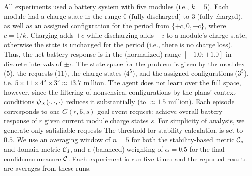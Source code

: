 All experiments used a battery system with five modules (i.e., $k=5$). 
%
Each module had a charge state in the range $0$ (fully discharged) to $3$ (fully charged), as well as an assigned configuration for the period from $\{+c, 0, -c\}$, where $c=1/k$.
%
%
Charging adds $+c$ while discharging adds $-c$ to a module's charge state, otherwise the state is unchanged for the period (i.e., there is no charge loss). Thus, the net battery response is in the (normalized) range $[-1.0:+1.0]$ in discrete intervals of $\pm c$. The state space for the problem is given by the modules ($5$), the requests ($11$), the charge states ($4^5$), and the assigned configurations ($3^5$), i.e. $5 \times 11 \times 4^5 \times 3^5 \approx 13.7$ million. The agent does not learn over the full space, however, since the filtering of nonsensical configurations by the plans' context conditions $\psi_X(\cdot,\cdot,\cdot)$ reduces it substantially (to $\approx1.5$ million).
%
Each episode corresponds to one $G(r,5,s)$ goal-event request: achieve overall battery response of $r$ given current module charge states $s$.  For simplicity of analysis, we generate only satisfiable requests
The threshold for stability calculation is set to $0.5$. We use an averaging window of $n=5$ for both the stability-based metric ${\mathcal{C}}_s$ and domain metric ${\mathcal{C}}_d$, and a (balanced) weighting of $\alpha=0.5$ for the final confidence measure ${\mathcal{C}}$. Each experiment is run five times and the reported results are averages from these runs. 
%
